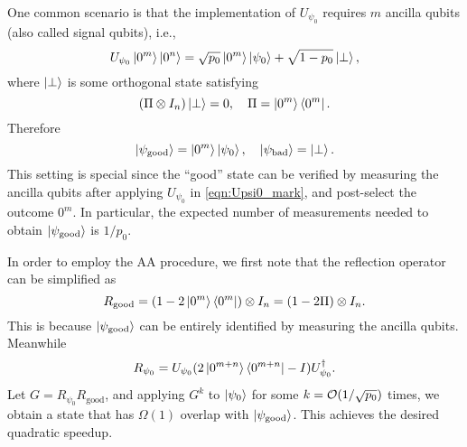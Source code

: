 \begin{exam}
  \label{exam:ref_signal}
One common scenario is that the implementation of $U_{\psi_0}$ requires $m$ ancilla qubits (also called signal qubits), i.e.,
\begin{equation}
U_{\psi_0}\ket{0^m}\ket{0^n}=\sqrt{p_0}\ket{0^m}\ket{\psi_0}+\sqrt{1-p_0}\ket{\perp},
\label{eqn:Upsi0_mark}
\end{equation}
where $\ket{\perp}$ is some orthogonal state satisfying
\begin{equation}
(\Pi\otimes I_n)\ket{\perp}=0, \quad \Pi=\ket{0^m}\bra{0^m}.
\end{equation}
Therefore
\begin{equation}
\ket{\psi_{\mathrm{good}}}=\ket{0^m}\ket{\psi_0}, \quad \ket{\psi_{\mathrm{bad}}}=\ket{\perp}.
\end{equation}
This setting is special since the ``good'' state can be verified by measuring the ancilla qubits after applying $U_{\psi_0}$ in \cref{eqn:Upsi0_mark}, and post-select the outcome $0^m$.
In particular, the expected number of measurements needed to obtain $\ket{\psi_{\mathrm{good}}}$ is $1/p_0$.

In order to employ the AA procedure, we first note that the reflection operator can be simplified as
\begin{equation}
R_{\mathrm{good}}=(1-2\ket{0^m}\bra{0^m})\otimes I_n=(1-2\Pi)\otimes I_n.
\end{equation}
This is because $\ket{\psi_{\mathrm{good}}}$ can be entirely identified by measuring the ancilla qubits. 
Meanwhile 
\begin{equation}
R_{\psi_0}=U_{\psi_0}(2\ket{0^{m+n}}\bra{0^{m+n}}-I)U^{\dag}_{\psi_0}.
\end{equation}
Let $G=R_{\psi_0}R_{\mathrm{good}}$, and applying $G^k$ to $\ket{\psi_0}$ for some $k=\mathcal{O}(1/\sqrt{p_0})$ times, we obtain a state that has $\Omega(1)$ overlap with $\ket{\psi_{\mathrm{good}}}$. 
This achieves the desired quadratic speedup.
\end{exam}


